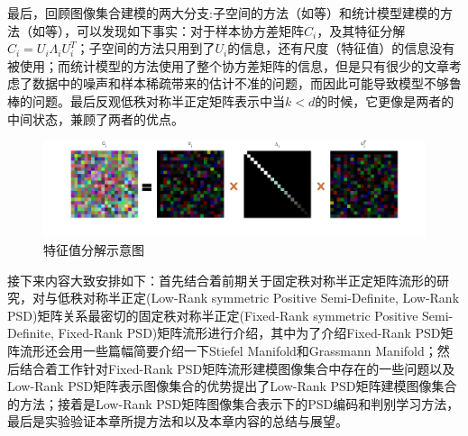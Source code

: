 最后，回顾图像集合建模的两大分支:子空间的方法（如\cite{Subspace_GDA,Subspace_MSM}等）和统计模型建模的方法（如\cite{Statistics_CDL,Statistics_Vemu,Statistics_SPDML,Statistics_LMKML,Statistics_HERML,Statistics_DARG}等），可以发现如下事实：对于样本协方差矩阵$C_{i}$，及其特征分解$C_{i}=U_{i}\Lambda_{i} U^{T}_{i}$；子空间的方法只用到了$U_{i}$的信息，还有尺度（特征值）的信息没有被使用；而统计模型的方法使用了整个协方差矩阵的信息，但是只有很少的文章考虑了数据中的噪声和样本稀疏带来的估计不准的问题，而因此可能导致模型不够鲁棒的问题。最后反观低秩对称半正定矩阵表示中当$k<d$的时候，它更像是两者的中间状态，兼顾了两者的优点。
\begin{figure}[hbt]
	\centering
	\includegraphics[width=0.95\linewidth]{source/svd_decomposition.png}
	\caption{特征值分解示意图}
	\label{fig:SVD_Decomposition}
\end{figure}

接下来内容大致安排如下：首先结合着前期关于固定秩对称半正定矩阵流形的研究，对与低秩对称半正定(Low-Rank symmetric Positive Semi-Definite, Low-Rank PSD)矩阵关系最密切的固定秩对称半正定(Fixed-Rank symmetric Positive Semi-Definite, Fixed-Rank PSD)矩阵流形进行介绍，其中为了介绍Fixed-Rank PSD矩阵流形还会用一些篇幅简要介绍一下Stiefel Manifold和Grassmann Manifold；然后结合着工作\cite{PSD_WACV}针对Fixed-Rank PSD矩阵流形建模图像集合中存在的一些问题以及Low-Rank PSD矩阵表示图像集合的优势提出了Low-Rank PSD矩阵建模图像集合的方法；接着是Low-Rank PSD矩阵图像集合表示下的PSD编码和判别学习方法，最后是实验验证本章所提方法和以及本章内容的总结与展望。

